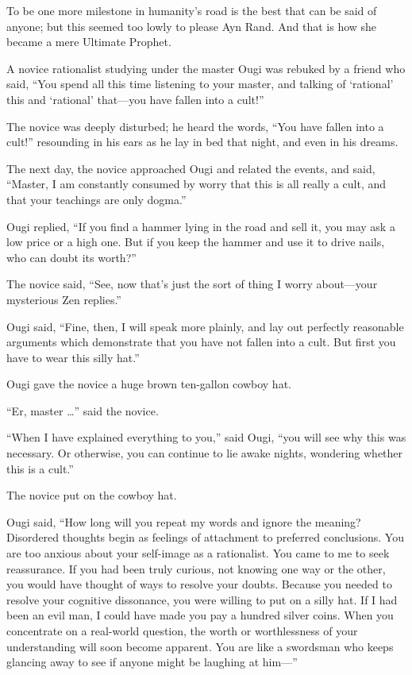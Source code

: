 {
 To be one more milestone in humanity's road is the
best that can be said of anyone; but this seemed too lowly to please
Ayn Rand. And that is how she became a mere Ultimate Prophet.}

\myendsectiontext


\bigskip


{
 A novice rationalist studying under the master Ougi was rebuked by
a friend who said, ``You spend all this time listening
to your master, and talking of
`rational' this and
`rational' that---you have fallen into a
cult!'' }

{
 The novice was deeply disturbed; he heard the words,
``You have fallen into a cult!''
resounding in his ears as he lay in bed that night, and even in his
dreams.}

{
 The next day, the novice approached Ougi and related the events,
and said, ``Master, I am constantly consumed by worry
that this is all really a cult, and that your teachings are only
dogma.''}

{
 Ougi replied, ``If you find a hammer lying in the
road and sell it, you may ask a low price or a high one. But if you
keep the hammer and use it to drive nails, who can doubt its
worth?''}

{
 The novice said, ``See, now
that's just the sort of thing I worry about---your
mysterious Zen replies.''}

{
 Ougi said, ``Fine, then, I will speak more
plainly, and lay out perfectly reasonable arguments which demonstrate
that you have not fallen into a cult. But first you have to wear this
silly hat.''}

{
 Ougi gave the novice a huge brown ten-gallon cowboy hat.}

{
 ``Er, master \ldots'' said the
novice.}

{
 ``When I have explained everything to
you,'' said Ougi, ``you will see why
this was necessary. Or otherwise, you can continue to lie awake nights,
wondering whether this is a cult.''}

{
 The novice put on the cowboy hat.}

{
 Ougi said, ``How long will you repeat my words
and ignore the meaning? Disordered thoughts begin as feelings of
attachment to preferred conclusions. You are too anxious about your
self-image as a rationalist. You came to me to seek reassurance. If you
had been truly curious, not knowing one way or the other, you would
have thought of ways to resolve your doubts. Because you needed to
resolve your cognitive dissonance, you were willing to put on a silly
hat. If I had been an evil man, I could have made you pay a hundred
silver coins. When you concentrate on a real-world question, the worth
or worthlessness of your understanding will soon become apparent. You
are like a swordsman who keeps glancing away to see if anyone might be
laughing at him---''}

